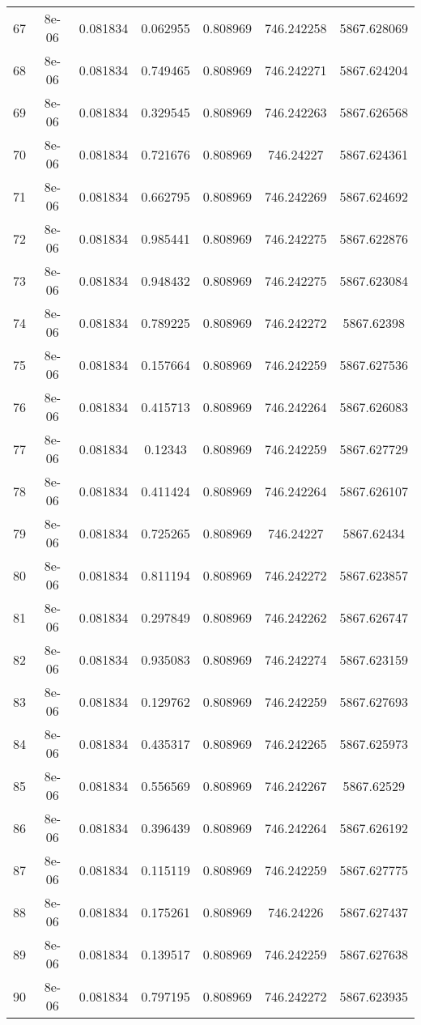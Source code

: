 \begin{table}
\begin{tabular*}{\linewidth}{c|c|c|c|c|c|c}
67 & 8e-06 & 0.081834 & 0.062955 & 0.808969 & 746.242258 & 5867.628069\\
68 & 8e-06 & 0.081834 & 0.749465 & 0.808969 & 746.242271 & 5867.624204\\
69 & 8e-06 & 0.081834 & 0.329545 & 0.808969 & 746.242263 & 5867.626568\\
70 & 8e-06 & 0.081834 & 0.721676 & 0.808969 & 746.24227 & 5867.624361\\
71 & 8e-06 & 0.081834 & 0.662795 & 0.808969 & 746.242269 & 5867.624692\\
72 & 8e-06 & 0.081834 & 0.985441 & 0.808969 & 746.242275 & 5867.622876\\
73 & 8e-06 & 0.081834 & 0.948432 & 0.808969 & 746.242275 & 5867.623084\\
74 & 8e-06 & 0.081834 & 0.789225 & 0.808969 & 746.242272 & 5867.62398\\
75 & 8e-06 & 0.081834 & 0.157664 & 0.808969 & 746.242259 & 5867.627536\\
76 & 8e-06 & 0.081834 & 0.415713 & 0.808969 & 746.242264 & 5867.626083\\
77 & 8e-06 & 0.081834 & 0.12343 & 0.808969 & 746.242259 & 5867.627729\\
78 & 8e-06 & 0.081834 & 0.411424 & 0.808969 & 746.242264 & 5867.626107\\
79 & 8e-06 & 0.081834 & 0.725265 & 0.808969 & 746.24227 & 5867.62434\\
80 & 8e-06 & 0.081834 & 0.811194 & 0.808969 & 746.242272 & 5867.623857\\
81 & 8e-06 & 0.081834 & 0.297849 & 0.808969 & 746.242262 & 5867.626747\\
82 & 8e-06 & 0.081834 & 0.935083 & 0.808969 & 746.242274 & 5867.623159\\
83 & 8e-06 & 0.081834 & 0.129762 & 0.808969 & 746.242259 & 5867.627693\\
84 & 8e-06 & 0.081834 & 0.435317 & 0.808969 & 746.242265 & 5867.625973\\
85 & 8e-06 & 0.081834 & 0.556569 & 0.808969 & 746.242267 & 5867.62529\\
86 & 8e-06 & 0.081834 & 0.396439 & 0.808969 & 746.242264 & 5867.626192\\
87 & 8e-06 & 0.081834 & 0.115119 & 0.808969 & 746.242259 & 5867.627775\\
88 & 8e-06 & 0.081834 & 0.175261 & 0.808969 & 746.24226 & 5867.627437\\
89 & 8e-06 & 0.081834 & 0.139517 & 0.808969 & 746.242259 & 5867.627638\\
90 & 8e-06 & 0.081834 & 0.797195 & 0.808969 & 746.242272 & 5867.623935\\
\end{tabular*}
\end{table}
